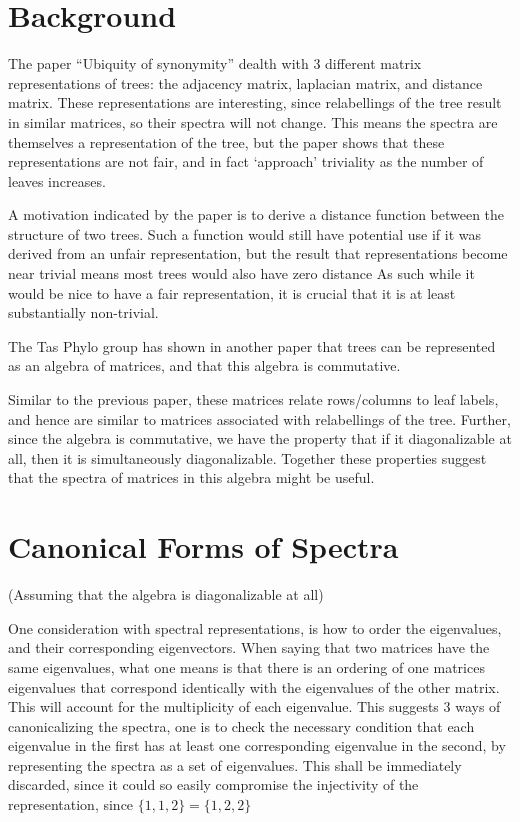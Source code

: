 \documentclass{report}
\begin{document}
\section{Background}

The paper ``Ubiquity of synonymity'' dealth with 3 different matrix
representations of trees: the adjacency matrix, laplacian matrix, and distance
matrix.
These representations are interesting, since relabellings of the tree result
in similar matrices, so their spectra will not change.
This means the spectra are themselves a representation of the tree, but the
paper shows that these representations are not fair, and in fact `approach'
triviality as the number of leaves increases.

A motivation indicated by the paper is to derive a distance function between
the structure of two trees.
Such a function would still have potential use if it was derived from an unfair
representation, but the result that representations become near trivial means
most trees would also have zero distance
As such while it would be nice to have a fair representation, it is crucial
that it is at least substantially non-trivial.

The Tas Phylo group has shown in another paper that trees can be represented as
an algebra of matrices, and that this algebra is commutative.

Similar to the previous paper, these matrices relate rows/columns to leaf
labels, and hence are similar to matrices associated with relabellings of the
tree.
Further, since the algebra is commutative, we have the property that if it
diagonalizable at all, then it is simultaneously diagonalizable.
Together these properties suggest that the spectra of matrices in this algebra
might be useful.

\section{Canonical Forms of Spectra}

(Assuming that the algebra is diagonalizable at all)

One consideration with spectral representations, is how to order the
eigenvalues, and their corresponding eigenvectors.  When saying that two
matrices have the same eigenvalues, what one means is that there is an ordering
of one matrices eigenvalues that correspond identically with the eigenvalues of
the other matrix. This will account for the multiplicity of each eigenvalue.
This suggests 3 ways of canonicalizing the spectra, one is to check the
necessary condition that each eigenvalue in the first has at least one
corresponding eigenvalue in the second, by representing the spectra as a set
of eigenvalues. This shall be immediately discarded, since it could so easily
compromise the injectivity of the representation, since
$\{1, 1, 2\} = \{1, 2, 2\}$
\end{document}
